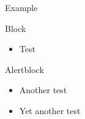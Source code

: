 \documentclass{beamer}
\begin{document}
\begin{frame}{Example}
  \begin{block}{Block}
    \begin{itemize}
    \item Test
    \end{itemize}
  \end{block}

  \begin{alertblock}{Alertblock}
    \begin{itemize}
    \item Another test
    \end{itemize}
  \end{alertblock}

  \begin{itemize}
  \item Yet another test
  \end{itemize}
\end{frame}
\end{document}
